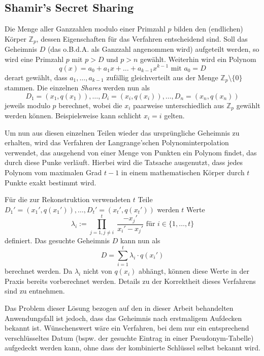 \subsection{Shamir's Secret Sharing}

\label{sec_basics_threshold_shamir}

Die Menge aller Ganzzahlen modulo einer Primzahl \(p\) bilden den (endlichen) Körper \(\mathbb{Z}_p\), dessen Eigenschaften für das Verfahren entscheidend sind. Soll das Geheimnis \(D\) (das o.B.d.A. als Ganzzahl angenommen wird) aufgeteilt werden, so wird eine Primzahl \(p\) mit \(p > D\) und \(p > n\) gewählt. Weiterhin wird ein Polynom 
\[q(x) = a_0 + a_1x + \dots + a_{k-1}x^{k-1} \text{ mit } a_0 = D\] 
derart gewählt, dass \(a_1, \dots, a_{k-1}\) zufällig gleichverteilt aus der Menge \(\mathbb{Z}_p \setminus \{0\}\) stammen. Die einzelnen \textit{Shares} werden nun als
\[D_1=(x_1,q(x_1)), \dots, D_i=(x_i,q(x_i)), \dots, D_n=(x_n,q(x_n))\]
jeweils modulo \(p\) berechnet, wobei die \(x_i\) paarweise unterschiedlich aus \(\mathbb{Z}_p\) gewählt werden können. Beispielsweise kann schlicht \(x_i = i\) gelten.

Um nun aus diesen einzelnen Teilen wieder das ursprüngliche Geheimnis zu erhalten, wird das Verfahren der Langrange'schen Polynominterpolation verwendet, das ausgehend von einer Menge von Punkten ein Polynom findet, das durch diese Punke verläuft. Hierbei wird die Tatsache ausgenutzt, dass jedes Polynom vom maximalen Grad \(t-1\) in einem mathematischen Körper durch \(t\) Punkte exakt bestimmt wird.

Für die zur Rekonstruktion verwendeten \(t\) Teile \(D_1'=(x_1',q(x_1')),\dots,D_t'=(x_t',q(x_t'))\) werden \(t\) Werte 
\[\lambda_i := \prod_{j=1, j \not= i}^{t} \; \frac{- x_j'}{x_i' - x_j'} \text{ für } i \in \{1,\dots,t\}\] 
definiert. Das gesuchte Geheimnis \(D\) kann nun als
\[D = \sum_{i=1}^{t}\lambda_i \cdot q(x_i')\]
berechnet werden. Da \(\lambda_i\) nicht von \(q(x_i)\) abhängt, können diese Werte in der Praxis bereits vorberechnet werden. Details zu der Korrektheit dieses Verfahrens sind \cite{boneh2016} zu entnehmen.

Das Problem dieser Lösung bezogen auf den in dieser Arbeit behandelten Anwendungsfall ist jedoch, dass das Geheimnis nach erstmaligem Aufdecken bekannt ist. Wünschenswert wäre ein Verfahren, bei dem nur ein entsprechend verschlüsseltes Datum (bspw. der gesuchte Eintrag in einer Pseudonym-Tabelle) aufgedeckt werden kann, ohne dass der kombinierte Schlüssel selbst bekannt wird. 

